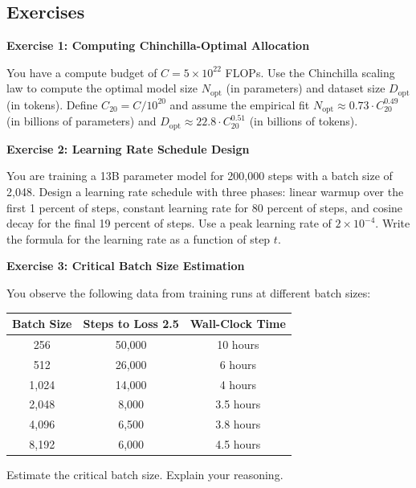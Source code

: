 \vspace{1.5em}

\subsection{Exercises}

\textbf{Exercise 1: Computing Chinchilla-Optimal Allocation}

You have a compute budget of $C = 5 \times 10^{22}$ FLOPs. Use the Chinchilla scaling law to compute the optimal model size $N_{\text{opt}}$ (in parameters) and dataset size $D_{\text{opt}}$ (in tokens). Define $C_{20} = C / 10^{20}$ and assume the empirical fit $N_{\text{opt}} \approx 0.73 \cdot C_{20}^{0.49}$ (in billions of parameters) and $D_{\text{opt}} \approx 22.8 \cdot C_{20}^{0.51}$ (in billions of tokens).

\vspace{0.5em}

\textbf{Exercise 2: Learning Rate Schedule Design}

You are training a 13B parameter model for 200,000 steps with a batch size of 2,048. Design a learning rate schedule with three phases: linear warmup over the first 1 percent of steps, constant learning rate for 80 percent of steps, and cosine decay for the final 19 percent of steps. Use a peak learning rate of $2 \times 10^{-4}$. Write the formula for the learning rate as a function of step $t$.

\vspace{0.5em}

\textbf{Exercise 3: Critical Batch Size Estimation}

You observe the following data from training runs at different batch sizes:

\begin{center}
\begin{tabular}{ccc}
Batch Size & Steps to Loss 2.5 & Wall-Clock Time \\
\hline
256 & 50,000 & 10 hours \\
512 & 26,000 & 6 hours \\
1,024 & 14,000 & 4 hours \\
2,048 & 8,000 & 3.5 hours \\
4,096 & 6,500 & 3.8 hours \\
8,192 & 6,000 & 4.5 hours \\
\end{tabular}
\end{center}

Estimate the critical batch size. Explain your reasoning.

